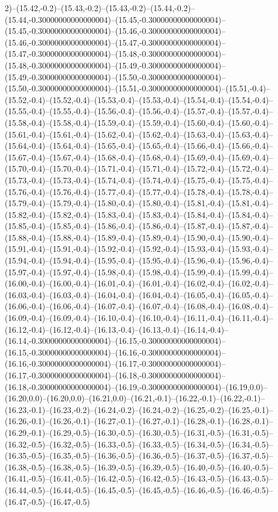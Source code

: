 2)--(15.42,-0.2)--(15.43,-0.2)--(15.43,-0.2)--(15.44,-0.2)--(15.44,-0.30000000000000004)--(15.45,-0.30000000000000004)--(15.45,-0.30000000000000004)--(15.46,-0.30000000000000004)--(15.46,-0.30000000000000004)--(15.47,-0.30000000000000004)--(15.47,-0.30000000000000004)--(15.48,-0.30000000000000004)--(15.48,-0.30000000000000004)--(15.49,-0.30000000000000004)--(15.49,-0.30000000000000004)--(15.50,-0.30000000000000004)--(15.50,-0.30000000000000004)--(15.51,-0.30000000000000004)--(15.51,-0.4)--(15.52,-0.4)--(15.52,-0.4)--(15.53,-0.4)--(15.53,-0.4)--(15.54,-0.4)--(15.54,-0.4)--(15.55,-0.4)--(15.55,-0.4)--(15.56,-0.4)--(15.56,-0.4)--(15.57,-0.4)--(15.57,-0.4)--(15.58,-0.4)--(15.58,-0.4)--(15.59,-0.4)--(15.59,-0.4)--(15.60,-0.4)--(15.60,-0.4)--(15.61,-0.4)--(15.61,-0.4)--(15.62,-0.4)--(15.62,-0.4)--(15.63,-0.4)--(15.63,-0.4)--(15.64,-0.4)--(15.64,-0.4)--(15.65,-0.4)--(15.65,-0.4)--(15.66,-0.4)--(15.66,-0.4)--(15.67,-0.4)--(15.67,-0.4)--(15.68,-0.4)--(15.68,-0.4)--(15.69,-0.4)--(15.69,-0.4)--(15.70,-0.4)--(15.70,-0.4)--(15.71,-0.4)--(15.71,-0.4)--(15.72,-0.4)--(15.72,-0.4)--(15.73,-0.4)--(15.73,-0.4)--(15.74,-0.4)--(15.74,-0.4)--(15.75,-0.4)--(15.75,-0.4)--(15.76,-0.4)--(15.76,-0.4)--(15.77,-0.4)--(15.77,-0.4)--(15.78,-0.4)--(15.78,-0.4)--(15.79,-0.4)--(15.79,-0.4)--(15.80,-0.4)--(15.80,-0.4)--(15.81,-0.4)--(15.81,-0.4)--(15.82,-0.4)--(15.82,-0.4)--(15.83,-0.4)--(15.83,-0.4)--(15.84,-0.4)--(15.84,-0.4)--(15.85,-0.4)--(15.85,-0.4)--(15.86,-0.4)--(15.86,-0.4)--(15.87,-0.4)--(15.87,-0.4)--(15.88,-0.4)--(15.88,-0.4)--(15.89,-0.4)--(15.89,-0.4)--(15.90,-0.4)--(15.90,-0.4)--(15.91,-0.4)--(15.91,-0.4)--(15.92,-0.4)--(15.92,-0.4)--(15.93,-0.4)--(15.93,-0.4)--(15.94,-0.4)--(15.94,-0.4)--(15.95,-0.4)--(15.95,-0.4)--(15.96,-0.4)--(15.96,-0.4)--(15.97,-0.4)--(15.97,-0.4)--(15.98,-0.4)--(15.98,-0.4)--(15.99,-0.4)--(15.99,-0.4)--(16.00,-0.4)--(16.00,-0.4)--(16.01,-0.4)--(16.01,-0.4)--(16.02,-0.4)--(16.02,-0.4)--(16.03,-0.4)--(16.03,-0.4)--(16.04,-0.4)--(16.04,-0.4)--(16.05,-0.4)--(16.05,-0.4)--(16.06,-0.4)--(16.06,-0.4)--(16.07,-0.4)--(16.07,-0.4)--(16.08,-0.4)--(16.08,-0.4)--(16.09,-0.4)--(16.09,-0.4)--(16.10,-0.4)--(16.10,-0.4)--(16.11,-0.4)--(16.11,-0.4)--(16.12,-0.4)--(16.12,-0.4)--(16.13,-0.4)--(16.13,-0.4)--(16.14,-0.4)--(16.14,-0.30000000000000004)--(16.15,-0.30000000000000004)--(16.15,-0.30000000000000004)--(16.16,-0.30000000000000004)--(16.16,-0.30000000000000004)--(16.17,-0.30000000000000004)--(16.17,-0.30000000000000004)--(16.18,-0.30000000000000004)--(16.18,-0.30000000000000004)--(16.19,-0.30000000000000004)--(16.19,0.0)--(16.20,0.0)--(16.20,0.0)--(16.21,0.0)--(16.21,-0.1)--(16.22,-0.1)--(16.22,-0.1)--(16.23,-0.1)--(16.23,-0.2)--(16.24,-0.2)--(16.24,-0.2)--(16.25,-0.2)--(16.25,-0.1)--(16.26,-0.1)--(16.26,-0.1)--(16.27,-0.1)--(16.27,-0.1)--(16.28,-0.1)--(16.28,-0.1)--(16.29,-0.1)--(16.29,-0.5)--(16.30,-0.5)--(16.30,-0.5)--(16.31,-0.5)--(16.31,-0.5)--(16.32,-0.5)--(16.32,-0.5)--(16.33,-0.5)--(16.33,-0.5)--(16.34,-0.5)--(16.34,-0.5)--(16.35,-0.5)--(16.35,-0.5)--(16.36,-0.5)--(16.36,-0.5)--(16.37,-0.5)--(16.37,-0.5)--(16.38,-0.5)--(16.38,-0.5)--(16.39,-0.5)--(16.39,-0.5)--(16.40,-0.5)--(16.40,-0.5)--(16.41,-0.5)--(16.41,-0.5)--(16.42,-0.5)--(16.42,-0.5)--(16.43,-0.5)--(16.43,-0.5)--(16.44,-0.5)--(16.44,-0.5)--(16.45,-0.5)--(16.45,-0.5)--(16.46,-0.5)--(16.46,-0.5)--(16.47,-0.5)--(16.47,-0.5)